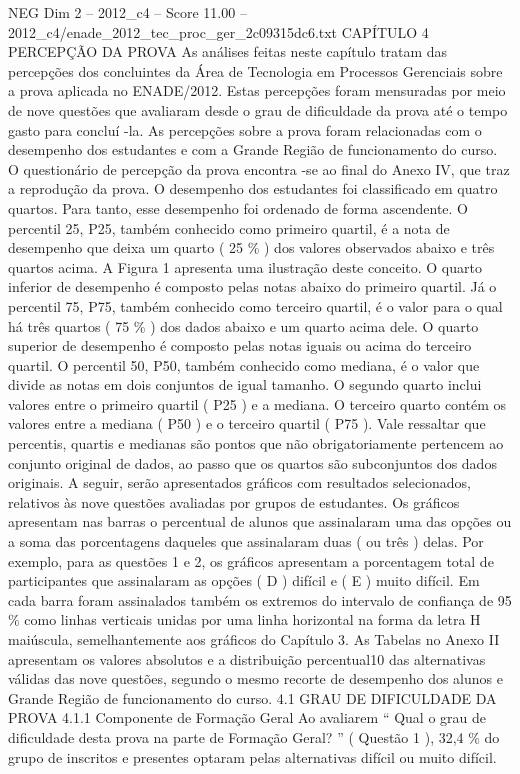 \begin{textsample}{NEG Dim 2 – 2012\_c4 – Score 11.00 – 2012\_c4/enade\_2012\_tec\_proc\_ger\_2c09315dc6.txt}  \label{ex:f2_neg_330}
CAPÍTULO 4 PERCEPÇÃO DA PROVA As análises feitas neste capítulo tratam das percepções dos concluintes da Área de Tecnologia em Processos Gerenciais sobre a prova aplicada no ENADE/2012.
Estas percepções foram mensuradas por meio de nove questões que avaliaram desde o grau de dificuldade da prova até o tempo gasto para concluí -la.
As percepções sobre a prova foram relacionadas com o desempenho dos estudantes e com a Grande Região de funcionamento do curso.
O questionário de percepção da prova encontra -se ao final do Anexo IV, que traz a reprodução da prova.
O desempenho dos estudantes foi classificado em quatro quartos.
Para tanto, esse desempenho foi ordenado de forma ascendente.
O percentil 25, P25, também conhecido como primeiro quartil, é a nota de desempenho que deixa um quarto ( 25 \% ) dos valores observados abaixo e três quartos acima.
A Figura 1 apresenta uma ilustração deste conceito.
O quarto inferior de desempenho é composto pelas notas abaixo do primeiro quartil.
Já o percentil 75, P75, também conhecido como terceiro quartil, é o valor para o qual há três quartos ( 75 \% ) dos dados abaixo e um quarto acima dele.
O quarto superior de desempenho é composto pelas notas iguais ou acima do terceiro quartil.
O percentil 50, P50, também conhecido como mediana, é o valor que divide as notas em dois conjuntos de igual tamanho.
O segundo quarto inclui valores entre o primeiro quartil ( P25 ) e a mediana.
O terceiro quarto contém os valores entre a mediana ( P50 ) e o terceiro quartil ( P75 ).
Vale ressaltar que percentis, quartis e medianas são pontos que não obrigatoriamente pertencem ao conjunto original de dados, ao passo que os quartos são subconjuntos dos dados originais.
A seguir, serão apresentados gráficos com resultados selecionados, relativos às nove questões avaliadas por grupos de estudantes.
Os gráficos apresentam nas barras o percentual de alunos que assinalaram uma das opções ou a soma das porcentagens daqueles que assinalaram duas ( ou três ) delas.
Por exemplo, para as questões 1 e 2, os gráficos apresentam a porcentagem total de participantes que assinalaram as opções ( D ) difícil e ( E ) muito difícil.
Em cada barra foram assinalados também os extremos do intervalo de confiança de 95 \% como linhas verticais unidas por uma linha horizontal na forma da letra H maiúscula, semelhantemente aos gráficos do Capítulo 3.
As Tabelas no Anexo II apresentam os valores absolutos e a distribuição percentual10 das alternativas válidas das nove questões, segundo o mesmo recorte de desempenho dos alunos e Grande Região de funcionamento do curso. 4.1 GRAU DE DIFICULDADE DA PROVA 4.1.1 Componente de Formação Geral Ao avaliarem “ Qual o grau de dificuldade desta prova na parte de Formação Geral? ” ( Questão 1 ), 32,4 \% do grupo de inscritos e presentes optaram pelas alternativas difícil ou muito difícil.

\end{textsample}
